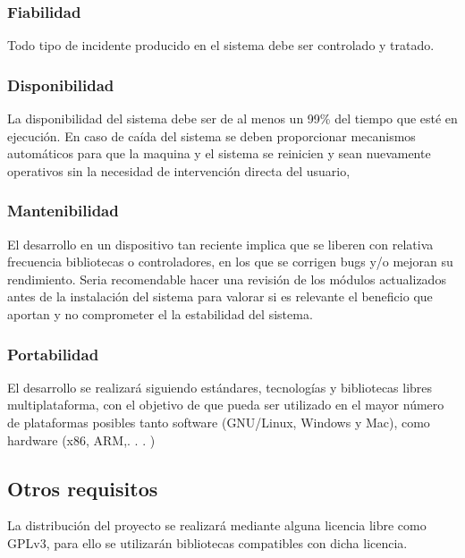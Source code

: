 \subsubsection{Fiabilidad}
Todo tipo de incidente producido en el sistema debe ser controlado y tratado. 
\subsubsection{Disponibilidad}
La disponibilidad del sistema debe ser de al menos un 99\% del tiempo que esté en ejecución. En caso de caída del sistema se deben proporcionar mecanismos automáticos para que la maquina y el sistema se reinicien y sean nuevamente operativos sin la necesidad de intervención directa del usuario,
\subsubsection{Mantenibilidad}
El desarrollo en un dispositivo tan reciente implica que se liberen con relativa frecuencia bibliotecas o controladores, en los que se corrigen bugs y/o mejoran su rendimiento. Seria recomendable hacer una revisión de los módulos actualizados antes de la instalación del sistema para valorar si es relevante el beneficio que aportan y no comprometer el la estabilidad del sistema.  
\subsubsection{Portabilidad}
El desarrollo se  realizará siguiendo estándares, tecnologías y bibliotecas libres multiplataforma, con el objetivo de que pueda ser utilizado en el mayor número de plataformas posibles tanto software (GNU/Linux, Windows y Mac), como hardware (x86, ARM,. . . )

\subsection{Otros requisitos}
La distribución del proyecto se realizará mediante alguna licencia libre como GPLv3, para ello se utilizarán bibliotecas compatibles con dicha licencia.

